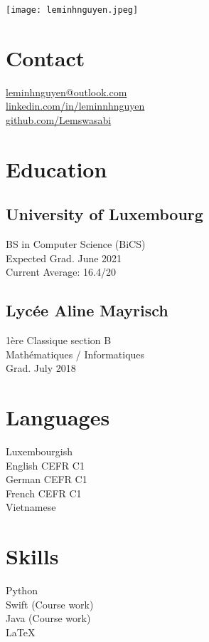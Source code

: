 \documentclass[]{curriculumvitae}
\begin{document}
\hfill \texttt{[image: leminhnguyen.jpeg]}
    
\begin{minipage}[t]{0.34\textwidth} 

\section{Contact}
\faEnvelope \hspace{1em} \href{}{leminhnguyen@outlook.com}\\ 
\faLinkedin \hspace{1em} \href{https://www.linkedin.com/in/leminnhnguyen}{linkedin.com/in/leminnhnguyen}\\
\faGithub \hspace{1em} \href{https://github.com/Lemswasabi}{github.com/Lemswasabi}
\sectionsep

\section{Education} 
\subsection{University of Luxembourg}
BS in Computer Science (BiCS)\\
Expected Grad. June 2021\\
Current Average: 16.4/20\\

\subsection{Lycée Aline Mayrisch}
1ère Classique section B\\
Mathématiques / Informatiques\\
Grad. July 2018
\sectionsep

\section{Languages}
Luxembourgish\\
English CEFR C1\\
German CEFR C1\\
French CEFR C1\\
Vietnamese
\sectionsep

\section{Skills}
Python\\
Swift (Course work)\\
Java (Course work)\\
LaTeX
\sectionsep


\end{minipage}
\end{document}
